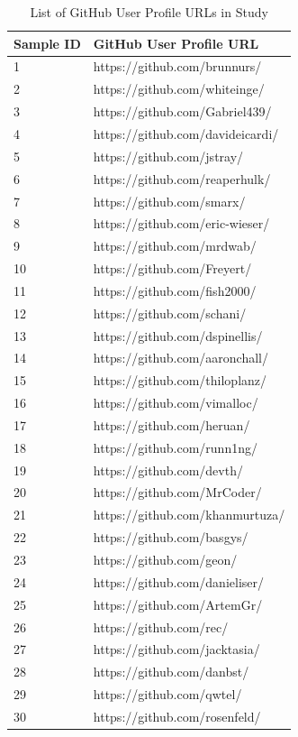 \begin{center}
\begin{longtable}{|p{2cm}|p{7cm}|}
\caption{List of GitHub User Profile URLs in Study} \label{survey_GH_userURLS} \\
 \hline
\textbf{Sample ID} & \textbf{GitHub User Profile URL} \\
 \hline
1 & https://github.com/brunnurs/ \\
2 & https://github.com/whiteinge/ \\
3 & https://github.com/Gabriel439/ \\
4 & https://github.com/davideicardi/ \\
5 & https://github.com/jstray/ \\
6 & https://github.com/reaperhulk/ \\
7 & https://github.com/smarx/ \\
8 & https://github.com/eric-wieser/ \\
9 & https://github.com/mrdwab/ \\
10 & https://github.com/Freyert/ \\
11 & https://github.com/fish2000/ \\
12 & https://github.com/schani/ \\
13 & https://github.com/dspinellis/ \\
14 & https://github.com/aaronchall/ \\
15 & https://github.com/thiloplanz/ \\
16 & https://github.com/vimalloc/ \\
17 & https://github.com/heruan/ \\
18 & https://github.com/runn1ng/ \\
19 & https://github.com/devth/ \\
20 & https://github.com/MrCoder/ \\
21 & https://github.com/khanmurtuza/ \\
22 & https://github.com/basgys/ \\
23 & https://github.com/geon/ \\
24 & https://github.com/danieliser/ \\
25 & https://github.com/ArtemGr/ \\
26 & https://github.com/rec/ \\
27 & https://github.com/jacktasia/ \\
28 & https://github.com/danbst/ \\
29 & https://github.com/qwtel/ \\
30 & https://github.com/rosenfeld/ \\

\end{longtable}
\end{center}
